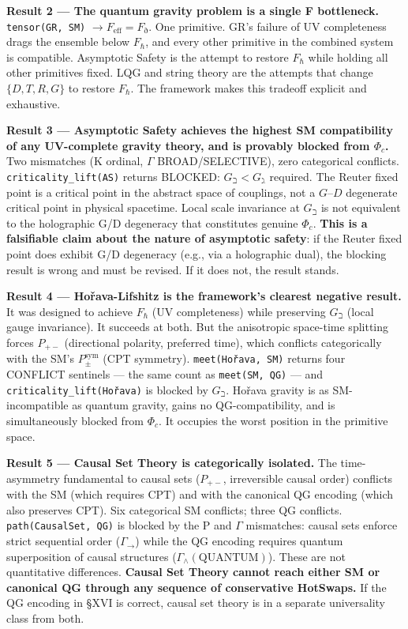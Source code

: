 \documentclass[12pt,a4paper]{article}
\begin{document}
\textbf{Result 2 --- The quantum gravity problem is a single F bottleneck.} \texttt{tensor(GR, SM)} $\to F_{\text{eff}} = F_{\eth}$. One primitive. GR's failure of UV completeness drags the ensemble below $F_{\hbar}$, and every other primitive in the combined system is compatible. Asymptotic Safety is the attempt to restore $F_{\hbar}$ while holding all other primitives fixed. LQG and string theory are the attempts that change $\{D, T, R, G\}$ to restore $F_{\hbar}$. The framework makes this tradeoff explicit and exhaustive.

\textbf{Result 3 --- Asymptotic Safety achieves the highest SM compatibility of any UV-complete gravity theory, and is provably blocked from $\Phi_c$.} Two mismatches (K ordinal, $\Gamma$ BROAD/SELECTIVE), zero categorical conflicts. \texttt{criticality\_lift(AS)} returns BLOCKED: $G_{\beth} < G_{\gimel}$ required. The Reuter fixed point is a critical point in the abstract space of couplings, not a $G$--$D$ degenerate critical point in physical spacetime. Local scale invariance at $G_{\beth}$ is not equivalent to the holographic G/D degeneracy that constitutes genuine $\Phi_c$. \textbf{This is a falsifiable claim about the nature of asymptotic safety}: if the Reuter fixed point does exhibit G/D degeneracy (e.g., via a holographic dual), the blocking result is wrong and must be revised. If it does not, the result stands.

\textbf{Result 4 --- Hořava-Lifshitz is the framework's clearest negative result.} It was designed to achieve $F_{\hbar}$ (UV completeness) while preserving $G_{\beth}$ (local gauge invariance). It succeeds at both. But the anisotropic space-time splitting forces $P_{+-}$ (directional polarity, preferred time), which conflicts categorically with the SM's $P_{\pm}^{\text{sym}}$ (CPT symmetry). \texttt{meet(Hořava, SM)} returns four CONFLICT sentinels --- the same count as \texttt{meet(SM, QG)} --- and \texttt{criticality\_lift(Hořava)} is blocked by $G_{\beth}$. Hořava gravity is as SM-incompatible as quantum gravity, gains no QG-compatibility, and is simultaneously blocked from $\Phi_c$. It occupies the worst position in the primitive space.

\textbf{Result 5 --- Causal Set Theory is categorically isolated.} The time-asymmetry fundamental to causal sets ($P_{+-}$, irreversible causal order) conflicts with the SM (which requires CPT) and with the canonical QG encoding (which also preserves CPT). Six categorical SM conflicts; three QG conflicts. \texttt{path(CausalSet, QG)} is blocked by the P and $\Gamma$ mismatches: causal sets enforce strict sequential order ($\Gamma_{\to}$) while the QG encoding requires quantum superposition of causal structures ($\Gamma_{\wedge}(\text{QUANTUM})$). These are not quantitative differences. \textbf{Causal Set Theory cannot reach either SM or canonical QG through any sequence of conservative HotSwaps.} If the QG encoding in §XVI is correct, causal set theory is in a separate universality class from both.
\end{document}
